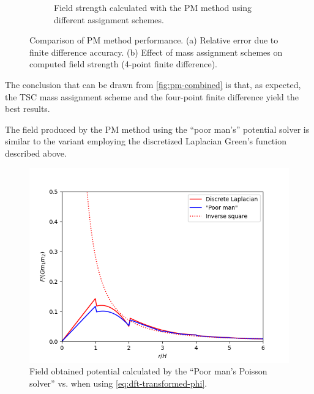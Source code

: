 \begin{figure}[htp]
\begin{subfigure}[t]{0.48\textwidth}
        \caption{Field strength calculated with the PM method using different assignment schemes.}
        \label{fig:pm-mass-assignment-field-strength}
    \end{subfigure}
    \caption{Comparison of PM method performance. (a) Relative error due to finite difference accuracy. (b) Effect of mass assignment schemes on computed field strength (4-point finite difference).}
    \label{fig:pm-combined}
\end{figure}
The conclusion that can be drawn from \autoref{fig:pm-combined} is that, as expected, the TSC mass assignment scheme and the four-point finite difference yield the best results.

The field produced by the PM method using the ``poor man's'' potential solver is similar to the variant employing the discretized Laplacian Green's function described above.
\begin{figure}[htp]
    \centering
    \includegraphics[scale=0.55]{chapters/pm-method/img/poor-man-vs-laplacian.png}
    \caption{Field obtained potential calculated by the ``Poor man's Poisson solver'' vs. when using \autoref{eq:dft-transformed-phi}.}
    \label{fig:pm-poor-man-vs-laplacian}
\end{figure}

